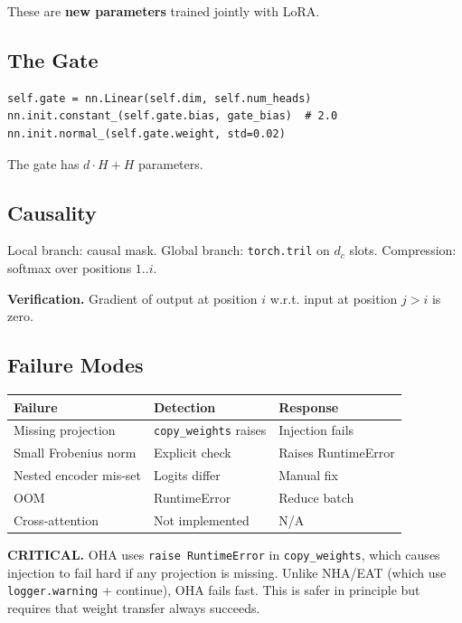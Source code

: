 These are \textbf{new parameters} trained jointly with LoRA.

\subsection{The Gate}

\begin{lstlisting}
self.gate = nn.Linear(self.dim, self.num_heads)
nn.init.constant_(self.gate.bias, gate_bias)  # 2.0
nn.init.normal_(self.gate.weight, std=0.02)
\end{lstlisting}

The gate has $d \cdot H + H$ parameters.

\subsection{Causality}

Local branch: causal mask.
Global branch: \texttt{torch.tril} on $d_c$ slots.
Compression: softmax over positions $1..i$.

\textbf{Verification.} Gradient of output at position $i$ w.r.t. input at 
position $j > i$ is zero.

\subsection{Failure Modes}

\begin{table}[H]
\centering
\small
\begin{tabular}{lll}
\toprule
\textbf{Failure} & \textbf{Detection} & \textbf{Response} \\
\midrule
Missing projection & \texttt{copy\_weights} raises & Injection fails \\
Small Frobenius norm & Explicit check & Raises RuntimeError \\
Nested encoder mis-set & Logits differ & Manual fix \\
OOM & RuntimeError & Reduce batch \\
Cross-attention & Not implemented & N/A \\
\bottomrule
\end{tabular}
\end{table}

\textbf{CRITICAL.} OHA uses \texttt{raise RuntimeError} in \texttt{copy\_weights}, which 
causes injection to fail hard if any projection is missing. Unlike 
NHA/EAT (which use \texttt{logger.warning} + continue), OHA fails fast. This 
is safer in principle but requires that weight transfer always succeeds.

